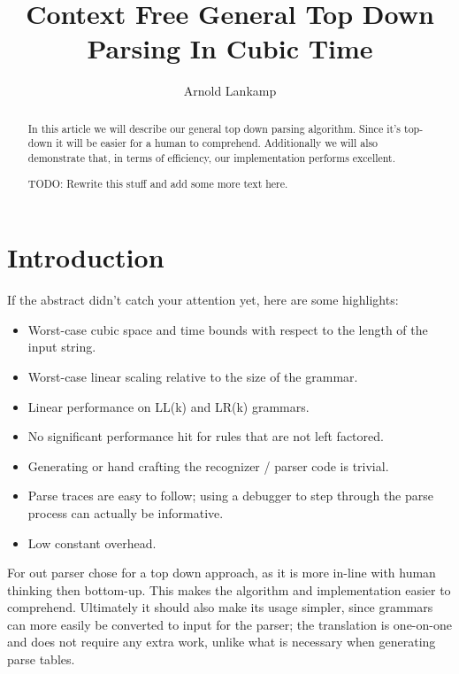 \documentclass[a4paper,10pt]{article}
\title{Context Free General Top Down Parsing In Cubic Time}
\author{Arnold Lankamp}
\begin{document}
\maketitle

\begin{abstract}

In this article we will describe our general top down parsing algorithm. Since it's top-down it will be easier for a human to comprehend. Additionally we will also demonstrate that, in terms of efficiency, our implementation performs excellent.

TODO: Rewrite this stuff and add some more text here.

\end{abstract}

\section{Introduction}

If the abstract didn't catch your attention yet, here are some highlights:
\begin{itemize}
 \setlength{\itemsep}{0pt}
 \setlength{\parskip}{0pt}
 \setlength{\parsep}{0pt}

 \item Worst-case cubic space and time bounds with respect to the length of the input string.
 \item Worst-case linear scaling relative to the size of the grammar.
 \item Linear performance on LL(k) and LR(k) grammars.
 \item No significant performance hit for rules that are not left factored.
 \item Generating or hand crafting the recognizer / parser code is trivial.
 \item Parse traces are easy to follow; using a debugger to step through the parse process can actually be informative.
 \item Low constant overhead.
\end{itemize}

For out parser chose for a top down approach, as it is more in-line with human thinking then bottom-up. This makes the algorithm and implementation easier to comprehend. Ultimately it should also make its usage simpler, since grammars can more easily be converted to input for the parser; the translation is one-on-one and does not require any extra work, unlike what is necessary when generating parse tables.
\end{document}
